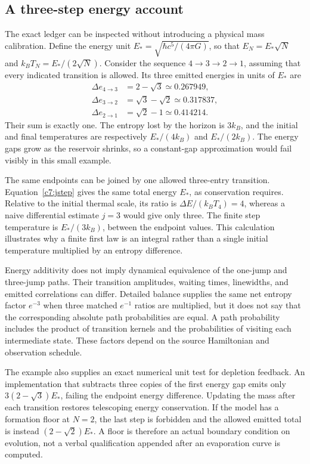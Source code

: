 \subsection{A three-step energy account}
The exact ledger can be inspected without introducing a physical mass calibration. Define the energy unit $E_*=\sqrt{\hbar c^5/(4\pi G)}$, so that $E_N=E_*\sqrt N$ and $k_BT_N=E_*/(2\sqrt N)$. Consider the sequence $4\to3\to2\to1$, assuming that every indicated transition is allowed. Its three emitted energies in units of $E_*$ are
\begin{equation}
 \begin{aligned}
 \Delta e_{4\to3}&=2-\sqrt3\simeq0.267949,\\
 \Delta e_{3\to2}&=\sqrt3-\sqrt2\simeq0.317837,\\
 \Delta e_{2\to1}&=\sqrt2-1\simeq0.414214.
 \end{aligned}
 \label{c7:workedsteps}
\end{equation}
Their sum is exactly one. The entropy lost by the horizon is $3k_B$, and the initial and final temperatures are respectively $E_*/(4k_B)$ and $E_*/(2k_B)$. The energy gaps grow as the reservoir shrinks, so a constant-gap approximation would fail visibly in this small example.

The same endpoints can be joined by one allowed three-entry transition. Equation~\eqref{c7:jstep} gives the same total energy $E_*$, as conservation requires. Relative to the initial thermal scale, its ratio is $\Delta E/(k_BT_4)=4$, whereas a naive differential estimate $j=3$ would give only three. The finite step temperature is $E_*/(3k_B)$, between the endpoint values. This calculation illustrates why a finite first law is an integral rather than a single initial temperature multiplied by an entropy difference.

Energy additivity does not imply dynamical equivalence of the one-jump and three-jump paths. Their transition amplitudes, waiting times, linewidths, and emitted correlations can differ. Detailed balance supplies the same net entropy factor $e^{-3}$ when three matched $e^{-1}$ ratios are multiplied, but it does not say that the corresponding absolute path probabilities are equal. A path probability includes the product of transition kernels and the probabilities of visiting each intermediate state. These factors depend on the source Hamiltonian and observation schedule.

The example also supplies an exact numerical unit test for depletion feedback. An implementation that subtracts three copies of the first energy gap emits only $3(2-\sqrt3)E_*$, failing the endpoint energy difference. Updating the mass after each transition restores telescoping energy conservation. If the model has a formation floor at $N=2$, the last step is forbidden and the allowed emitted total is instead $(2-\sqrt2)E_*$. A floor is therefore an actual boundary condition on evolution, not a verbal qualification appended after an evaporation curve is computed.

